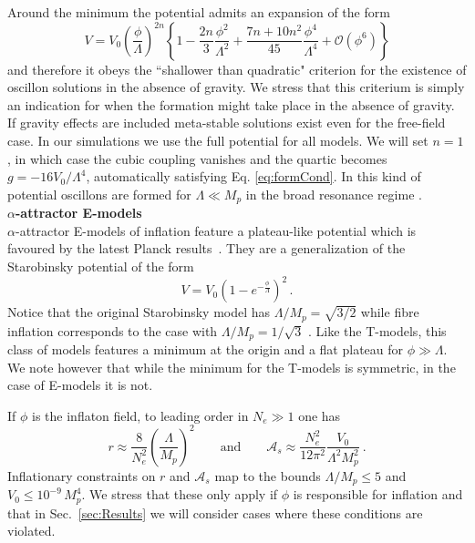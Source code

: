 \documentclass[11pt,a4paper]{article}
\begin{document}
Around the minimum the potential admits an expansion of the form
\begin{equation}
V=V_0 \left(\frac{\phi}{\Lambda}\right)^{2n} \left\{1-\frac{2n}{3}\frac{\phi^2}{\Lambda^2}+\frac{7 n+10 n^2}{45 }\frac{\phi^4}{\Lambda^4}+\mathcal{O}(\phi^6)\right\}
\end{equation}
and therefore it obeys the ``shallower than quadratic" criterion for the existence of oscillon solutions in the absence of gravity. We stress that this criterium is simply an indication for when the formation might take place in the absence of gravity. If gravity effects are included meta-stable solutions exist even for the free-field case. In our simulations we use the full potential for all models. We will set $n=1$, in which case the cubic coupling vanishes and the quartic becomes $g = - 16 V_0/\Lambda^4$, automatically satisfying Eq. \eqref{eq:formCond}. In this kind of potential oscillons are formed for $\Lambda \ll M_p$ in the broad resonance regime \cite{Amin:2019ums}.\\ 

\noindent \textbf{$\alpha$-attractor E-models}\\
\noindent $\alpha$-attractor E-models of inflation feature a plateau-like potential which is favoured by the latest Planck results~\cite{Akrami:2018odb}. They are a generalization of the Starobinsky potential of the form
\begin{equation}
\label{eq:StarobinskyPotential}
V = V_0 \left(1 - e^{-\frac{\phi}{\Lambda}}\right)^2 \,.
\end{equation}
Notice that the original Starobinsky model has $\Lambda/M_p = \sqrt{3/2}$ while {fibre inflation} corresponds to the case with $\Lambda/M_p = 1/\sqrt{3}$ \cite{Cicoli:2008gp}. Like the T-models, this class of models features a minimum at the origin and a flat plateau for $\phi\gg \Lambda$. We note however that while the minimum for the T-models is symmetric, in the case of E-models it is not.

If  $\phi$ is the inflaton field,  to leading order in $N_e\gg1$ one has
\begin{equation}
r\approx\frac{8}{N_e^2} \left(\frac{\Lambda}{M_p}\right)^2\qquad\text{and}\qquad \mathcal{A}_s\approx \frac{N_e^2}{12 \pi^2} \frac{V_0}{\Lambda^2 M_p^2}\ .
\end{equation}
Inflationary constraints on $r$ and $\mathcal{A}_s$ map to the bounds $\Lambda/M_p \leq 5$ and $V_0\le 10^{-9} \, M_p^4$. We stress that these only apply if $\phi$ is responsible for inflation and that in Sec.~\ref{sec:Results} we will consider cases where these conditions are violated.
\end{document}
